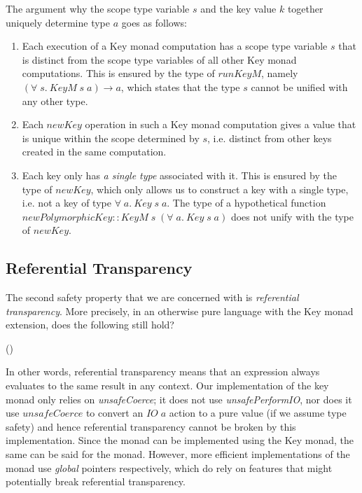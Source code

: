 \documentclass{sigplanconf}
\newcommand{\Conid}[1]{\mathit{#1}}
\newcommand{\Varid}[1]{\mathit{#1}}
\def\resethooks{%
  \global\let\SaveRestoreHook\empty
  \global\let\ColumnHook\empty}
\let\hspre\empty
\let\hspost\empty
\begin{document}
The argument why the scope type variable \ensuremath{\Varid{s}} and the key value \ensuremath{\Varid{k}} together uniquely determine type \ensuremath{\Varid{a}} goes as follows:
\begin{enumerate}
\item Each execution of a Key monad computation has a scope type variable \ensuremath{\Varid{s}} that is distinct from the scope type variables of all other Key monad computations. This is ensured by the type of \ensuremath{\Varid{runKeyM}}, namely \ensuremath{(\forall\;\Varid{s}.\:\Conid{KeyM}\;\Varid{s}\;\Varid{a})\to \Varid{a}}, which states that the type \ensuremath{\Varid{s}} cannot be unified with any other type. 
\item Each \ensuremath{\Varid{newKey}} operation in such a Key monad computation gives a value that is unique within the scope determined by \ensuremath{\Varid{s}}, i.e. distinct from other keys created in the same computation.
\item Each key only has \emph{a single type} associated with it. This is ensured by the type of \ensuremath{\Varid{newKey}}, which only allows us to construct a key with a single type, i.e. not a key of type \ensuremath{\forall\;\Varid{a}.\:\Conid{Key}\;\Varid{s}\;\Varid{a}}. The type of a hypothetical function \ensuremath{\Varid{newPolymorphicKey}\mathbin{::}\Conid{KeyM}\;\Varid{s}\;(\forall\;\Varid{a}.\:\Conid{Key}\;\Varid{s}\;\Varid{a})} does not unify with the type of \ensuremath{\Varid{newKey}}. 
\end{enumerate}




\subsection{Referential Transparency} 

The second safety property that we are concerned with is \emph{referential transparency}. More precisely, in an otherwise pure language with the Key monad extension, does the following still hold?
\begin{hscode}\SaveRestoreHook
\column{B}{@{}>{\hspre}l<{\hspost}@{}}%
\column{E}{@{}>{\hspre}l<{\hspost}@{}}%
\>[B]{}(\;\Varid{x}\mathrel{=}\Varid{e}\;\;\Varid{f}\;\Varid{x}\;\Varid{x})\equiv \Varid{f}\;\Varid{e}\;\Varid{e}{}\<[E]%
\ColumnHook
\end{hscode}\resethooks

In other words, referential transparency means that an expression always evaluates to the same result in any context. Our implementation of the key monad only relies on \emph{unsafeCoerce}; it does not use \emph{unsafePerformIO}, nor does it use \ensuremath{\Varid{unsafeCoerce}} to convert an \ensuremath{\Conid{IO}\;\Varid{a}} action to a pure value (if we assume type safety) and hence referential transparency cannot be broken by this implementation. Since the \st{} monad can be implemented using the Key monad, the same can be said for the \st{} monad. 
However, more efficient implementations of the \st{} monad use \emph{global} pointers respectively, which do rely on features that might potentially break referential transparency.
\end{document}
